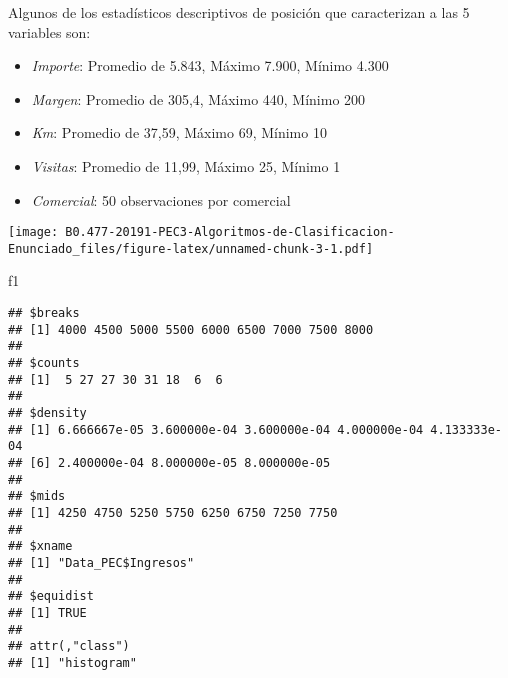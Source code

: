 \documentclass[]{article}
\newenvironment{Shaded}{\begin{snugshade}}{\end{snugshade}}
\newcommand{\KeywordTok}[1]{\textcolor[rgb]{0.94,0.87,0.69}{#1}}
\newcommand{\DataTypeTok}[1]{\textcolor[rgb]{0.87,0.87,0.75}{#1}}
\newcommand{\StringTok}[1]{\textcolor[rgb]{0.80,0.58,0.58}{#1}}
\newcommand{\CommentTok}[1]{\textcolor[rgb]{0.50,0.62,0.50}{#1}}
\newcommand{\OtherTok}[1]{\textcolor[rgb]{0.94,0.94,0.56}{#1}}
\newcommand{\OperatorTok}[1]{\textcolor[rgb]{0.94,0.94,0.82}{#1}}
\newcommand{\NormalTok}[1]{\textcolor[rgb]{0.80,0.80,0.80}{#1}}
\begin{document}
Algunos de los estadísticos descriptivos de posición que caracterizan a
las 5 variables son:

\begin{itemize}
\item
  \emph{Importe}: Promedio de 5.843, Máximo 7.900, Mínimo 4.300
\item
  \emph{Margen}: Promedio de 305,4, Máximo 440, Mínimo 200
\item
  \emph{Km}: Promedio de 37,59, Máximo 69, Mínimo 10
\item
  \emph{Visitas}: Promedio de 11,99, Máximo 25, Mínimo 1
\item
  \emph{Comercial}: 50 observaciones por comercial
\end{itemize}

\begin{Shaded}
\end{Shaded}

\texttt{[image: B0.477-20191-PEC3-Algoritmos-de-Clasificacion-Enunciado\_files/figure-latex/unnamed-chunk-3-1.pdf]}

\begin{Shaded}
\begin{Highlighting}[]
\NormalTok{f1}
\end{Highlighting}
\end{Shaded}

\begin{verbatim}
## $breaks
## [1] 4000 4500 5000 5500 6000 6500 7000 7500 8000
## 
## $counts
## [1]  5 27 27 30 31 18  6  6
## 
## $density
## [1] 6.666667e-05 3.600000e-04 3.600000e-04 4.000000e-04 4.133333e-04
## [6] 2.400000e-04 8.000000e-05 8.000000e-05
## 
## $mids
## [1] 4250 4750 5250 5750 6250 6750 7250 7750
## 
## $xname
## [1] "Data_PEC$Ingresos"
## 
## $equidist
## [1] TRUE
## 
## attr(,"class")
## [1] "histogram"
\end{verbatim}

\begin{Shaded}
\end{Shaded}
\end{document}
